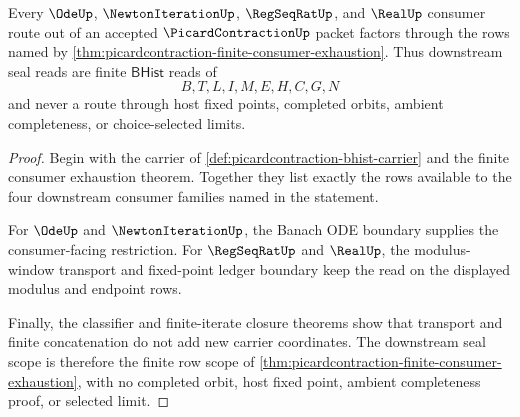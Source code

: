 \begin{theorem}
\label{thm:picardcontraction-downstream-seal-scope}
Every $\OdeUp$, $\NewtonIterationUp$, $\RegSeqRatUp$, and $\RealUp$ consumer route out of an accepted $\PicardContractionUp$ packet factors through the rows named by \autoref{thm:picardcontraction-finite-consumer-exhaustion}. Thus downstream seal reads are finite $\mathsf{BHist}$ reads of
$$
B,T,L,I,M,E,H,C,G,N
$$
and never a route through host fixed points, completed orbits, ambient completeness, or choice-selected limits.
\end{theorem}
\begin{proof}
Begin with the carrier of \autoref{def:picardcontraction-bhist-carrier} and the finite consumer exhaustion theorem. Together they list exactly the rows available to the four downstream consumer families named in the statement.

For $\OdeUp$ and $\NewtonIterationUp$, the Banach ODE boundary supplies the consumer-facing restriction. For $\RegSeqRatUp$ and $\RealUp$, the modulus-window transport and fixed-point ledger boundary keep the read on the displayed modulus and endpoint rows.

Finally, the classifier and finite-iterate closure theorems show that transport and finite concatenation do not add new carrier coordinates. The downstream seal scope is therefore the finite row scope of \autoref{thm:picardcontraction-finite-consumer-exhaustion}, with no completed orbit, host fixed point, ambient completeness proof, or selected limit.
\end{proof}
